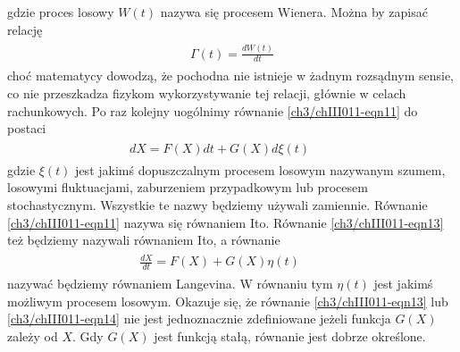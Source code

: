 \documentclass[a4paper,12pt,polish]{sphinxmanual}
\begin{document}
gdzie proces losowy $W(t)$ nazywa się procesem Wienera. Można by zapisać relację
\label{ch3/chIII011:equation-eqn12}\begin{gather}
\begin{split}\Gamma(t) = \frac{dW(t)}{dt}\end{split}\label{ch3/chIII011-eqn12}
\end{gather}
choć matematycy dowodzą, że pochodna nie istnieje w żadnym rozsądnym sensie, co nie przeszkadza fizykom wykorzystywanie tej relacji, głównie w celach rachunkowych. Po raz kolejny uogólnimy równanie \eqref{ch3/chIII011-eqn11} do postaci
\label{ch3/chIII011:equation-eqn13}\begin{gather}
\begin{split} dX = F(X) dt + G(X) d\xi(t) \qquad\end{split}\label{ch3/chIII011-eqn13}
\end{gather}
gdzie $\xi(t)$ jest jakimś dopuszczalnym procesem losowym nazywanym szumem, losowymi fluktuacjami, zaburzeniem przypadkowym lub procesem stochastycznym. Wszystkie te nazwy będziemy używali zamiennie. Równanie \eqref{ch3/chIII011-eqn11} nazywa się równaniem Ito. Równanie \eqref{ch3/chIII011-eqn13} też będziemy nazywali równaniem Ito, a równanie
\label{ch3/chIII011:equation-eqn14}\begin{gather}
\begin{split} \frac{dX}{dt} = F(X) + G(X) \eta(t) \qquad\end{split}\label{ch3/chIII011-eqn14}
\end{gather}
nazywać będziemy równaniem Langevina. W równaniu tym $\eta(t)$ jest jakimś możliwym procesem losowym. Okazuje się, że równanie \eqref{ch3/chIII011-eqn13} lub \eqref{ch3/chIII011-eqn14} nie jest jednoznacznie zdefiniowane jeżeli funkcja $G(X)$ zależy od $X$. Gdy $G(X)$ jest funkcją stałą, równanie jest dobrze określone.
\end{document}
